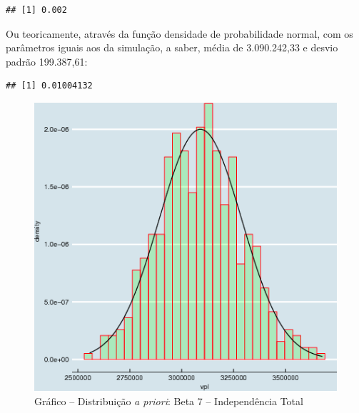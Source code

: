 \documentclass[a4paper]{article}
\newenvironment{Shaded}{\begin{snugshade}}{\end{snugshade}}
\newcommand{\KeywordTok}[1]{\textcolor[rgb]{0.13,0.29,0.53}{\textbf{#1}}}
\newcommand{\DataTypeTok}[1]{\textcolor[rgb]{0.13,0.29,0.53}{#1}}
\newcommand{\FloatTok}[1]{\textcolor[rgb]{0.00,0.00,0.81}{#1}}
\newcommand{\StringTok}[1]{\textcolor[rgb]{0.31,0.60,0.02}{#1}}
\newcommand{\OperatorTok}[1]{\textcolor[rgb]{0.81,0.36,0.00}{\textbf{#1}}}
\newcommand{\NormalTok}[1]{#1}
\begin{document}
\begin{Shaded}
\end{Shaded}

\begin{verbatim}
## [1] 0.002
\end{verbatim}

Ou teoricamente, através da função densidade de probabilidade normal,
com os parâmetros iguais aos da simulação, a saber, média de
3.090.242,33 e desvio padrão 199.387,61:

\begin{Shaded}
\end{Shaded}

\begin{verbatim}
## [1] 0.01004132
\end{verbatim}

\begin{figure}[H]

{\centering \includegraphics[width=0.7\linewidth]{images/histbeta7-1} 

}

\caption{Gráfico -- Distribuição \emph{a priori}: Beta 7 -- Independência Total}\label{fig:histbeta7}
\end{figure}
\end{document}
